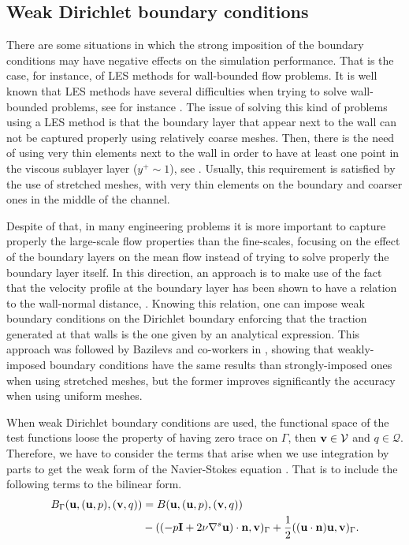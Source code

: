 \subsection{Weak Dirichlet boundary conditions}
\label{subsec-C7_weak_bcs}
There are some situations in which the strong imposition of the boundary conditions may have negative effects on the simulation performance. That is the case, for instance, of LES methods for wall-bounded flow problems. It is well known that LES methods have several difficulties when trying to solve wall-bounded problems, see for instance \cite{spalart_strategies_2000,spalart1997comments}. The issue of solving this kind of problems using a LES method is that the boundary layer that appear next to the wall can not be captured properly using relatively coarse meshes. Then, there is the need of using very thin elements next to the wall in order to have at least one point in the viscous sublayer layer ($ y^+\sim1 $), see \cite{pope_turbulent_2000}. Usually, this requirement is satisfied by the use of stretched meshes, with very thin elements on the boundary and coarser ones in the middle of the channel.

Despite of that, in many engineering problems it is more important to capture properly the large-scale flow properties than the fine-scales, focusing on the effect of the boundary layers on the mean flow instead of trying to solve properly the boundary layer itself. In this direction, an approach is to make use of the fact that the velocity profile at the boundary layer has been shown to have a relation to the wall-normal distance, \cite{pope_turbulent_2000}. Knowing this relation, one can impose weak boundary conditions on the Dirichlet boundary enforcing that the traction generated at that walls is the one given by an analytical expression. This approach was followed by Bazilevs and co-workers in \cite{bazilevs_weak_2007}, showing that weakly-imposed boundary conditions have the same results than strongly-imposed ones when using stretched meshes, but the former improves significantly the accuracy when using uniform meshes. 

When weak Dirichlet boundary conditions are used, the functional space of the test functions loose the property of having zero trace on $\Gamma$, then ${\bf v}\in\mathcal{V}$ and $q\in\mathcal{Q}$. Therefore, we have to consider the terms that arise when we use integration by parts to get the weak form of the Navier-Stokes equation . That is to include the following terms to the bilinear form.
\begin{align}
\label{eq-C7_bilinear_boundary}
B_\Gamma({\bf u},({\bf u},p),({\bf v},q))&=B({\bf u},({\bf u},p),({\bf v},q))\\\nonumber
&-((-p\mathbf{I}+2\nu\nabla^s{\bf u})\cdot{\bf n},{\bf v})_\Gamma+\frac{1}{2}(({\bf u}\cdot{\bf n}){\bf u},{\bf v})_\Gamma.
\end{align}

